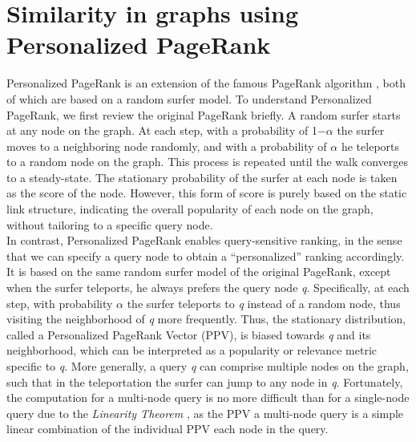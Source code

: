 \documentclass[11pt,oneside]{book}
\let\Oldsection\section
\renewcommand{\section}{\FloatBarrier\Oldsection}
\begin{document}
\section{Similarity in graphs using Personalized PageRank}

Personalized PageRank
is an extension of the famous PageRank algorithm \cite{page1999pagerank}, both of
which are based on a random surfer model. To understand Personalized PageRank, we first review the original
PageRank briefly. A random surfer starts at any node on the
graph. At each step, with a probability of 1−$\alpha$ the surfer moves to
a neighboring node randomly, and with a probability of $\alpha$ he teleports to a random node on the graph. This process
is repeated until the walk converges to a steady-state. The stationary
probability of the surfer at each node is taken as the score of
the node. However, this form of score is purely based on the static
link structure, indicating the overall popularity of each node on the
graph, without tailoring to a specific query node.\\
In contrast, Personalized PageRank enables query-sensitive ranking,
in the sense that we can specify a query node to obtain a “personalized”
ranking accordingly. It is based on the same random
surfer model of the original PageRank, except when the surfer teleports,
he always prefers the query node \textit{q}. Specifically, at each
step, with probability $\alpha$ the surfer teleports to \textit{q} instead of a random
node, thus visiting the neighborhood of \textit{q} more frequently.
Thus, the stationary distribution, called a Personalized PageRank
Vector (PPV), is biased towards \textit{q} and its neighborhood, which can
be interpreted as a popularity or relevance metric specific to \textit{q}.
More generally, a query \textit{q} can comprise multiple nodes on the
graph, such that in the teleportation the surfer can jump to any
node in \textit{q}. Fortunately, the computation for a multi-node query is
no more difficult than for a single-node query due to the \textit{Linearity Theorem} \citep{jeh2003scaling}, as the PPV a multi-node query is a simple
linear combination of the individual PPV each node in the
query.

\end{document}
